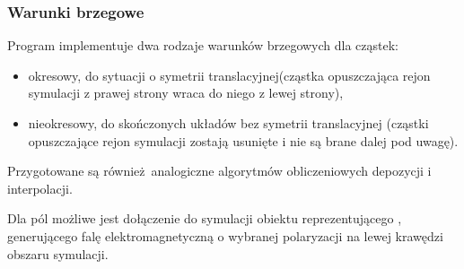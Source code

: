 





\subsubsection{Warunki brzegowe}
Program implementuje dwa rodzaje warunków brzegowych dla cząstek:
\begin{itemize}
\item okresowy, do sytuacji o symetrii translacyjnej(cząstka opuszczająca rejon symulacji z prawej strony wraca do niego z lewej strony),
\item nieokresowy, do skończonych układów bez symetrii translacyjnej (cząstki opuszczające rejon symulacji zostają usunięte i nie są brane
dalej pod uwagę).
\end{itemize}

Przygotowane są również analogiczne  
algorytmów obliczeniowych depozycji i interpolacji.

Dla pól możliwe jest dołączenie do symulacji obiektu reprezentującego ,
generującego falę elektromagnetyczną o wybranej polaryzacji na lewej krawędzi obszaru symulacji.
